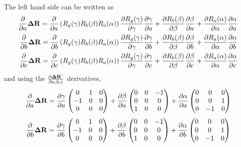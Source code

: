 \documentclass{article}
\def\vec#1{\ensuremath{\mathrm{\bf #1}}}
\def\partder#1#2{\ensuremath{\frac{\partial #1}{\partial #2}}}
\begin{document}
The left hand side can be written as
\begin{eqnarray}
\partder{}{a} \vec{\Delta R} = \partder{}{a} \left( R_g(\gamma) R_b(\beta) R_a(\alpha)    \right) \partder{ R_g(\gamma) }{\gamma} \partder{\gamma}{a} + 
\partder{ R_b(\beta) }{\beta} \partder{\beta}{a} + 
\partder{ R_a(\alpha) }{\alpha} \partder{\alpha}{a}  \nonumber \\
\partder{}{b} \vec{\Delta R} = \partder{}{b} \left( R_g(\gamma) R_b(\beta) R_a(\alpha)    \right) \partder{ R_g(\gamma) }{\gamma} \partder{\gamma}{b} + 
\partder{ R_b(\beta) }{\beta} \partder{\beta}{b} + 
\partder{ R_a(\alpha) }{\alpha} \partder{\alpha}{b}  \nonumber \\
\partder{}{c} \vec{\Delta R} = \partder{}{c} \left( R_g(\gamma) R_b(\beta) R_a(\alpha)    \right) \partder{ R_g(\gamma) }{\gamma} \partder{\gamma}{c} + 
\partder{ R_b(\beta) }{\beta} \partder{\beta}{c} + 
\partder{ R_a(\alpha) }{\alpha} \partder{\alpha}{c}  
\end{eqnarray}
and using the  $\partder{\vec{\Delta R}'}{a,b,c}$ derivatives,
\[
\partder{}{a} \vec{\Delta R} = 
\partder{\gamma}{a}
\begin{pmatrix}
 0 & 1 & 0 \\
 -1 & 0 & 0 \\
 0 & 0 & 0  
 \end{pmatrix}
 + \partder{\beta}{a}
\begin{pmatrix}
 0 & 0 & -1 \\
 0 & 0 & 0 \\
 1 & 0 & 0  
 \end{pmatrix}
 + \partder{\alpha}{a}
\begin{pmatrix}
 0 & 0 & 0 \\
 0 & 0 & 1 \\
 0 & -1 & 0  
 \end{pmatrix}
\]
\[
\partder{}{b} \vec{\Delta R} = 
\partder{\gamma}{b}
\begin{pmatrix}
 0 & 1 & 0 \\
 -1 & 0 & 0 \\
 0 & 0 & 0  
 \end{pmatrix}
 + \partder{\beta}{b}
\begin{pmatrix}
 0 & 0 & -1 \\
 0 & 0 & 0 \\
 1 & 0 & 0  
 \end{pmatrix}
 + \partder{\alpha}{b}
\begin{pmatrix}
 0 & 0 & 0 \\
 0 & 0 & 1 \\
 0 & -1 & 0  
 \end{pmatrix}
\]
\end{document}

